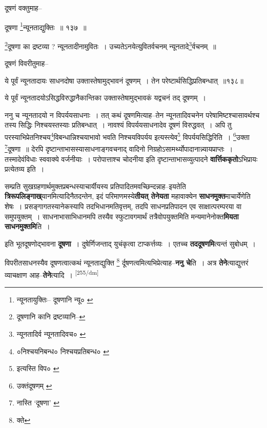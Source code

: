 \documentclass[article,12pt,a4paper]{memoir}
\begin{document}
	दूषणं वक्तुमाह-- 
	  
	दूषणा \footnote{न्यूनतायुक्तिः--\cite{dp-msB} \cite{dp-edP} \cite{dp-edH} दूषणानि न्यू० \cite{dp-edE}}न्यूनताद्युक्तिः ॥ १३७ ॥ 
	  
	\footnote{दूषणानि कानि द्रष्टव्यानि--\cite{dp-edE}}दूषणा का द्रष्टव्या ? न्यूनतादीनामुवितः । उच्यतेऽनयेत्युवितर्वचनम् न्यूनतादे\footnote{न्यूनतादिर्व \cite{dp-msA} \cite{dp-msB} \cite{dp-edP} \cite{dp-edH} न्यूनतादिवच० \cite{dp-edE} \cite{dp-edN}}र्वचनम् ॥ 
	  
	दूषणं विवरीतुमाह-- 
	  
	ये पूर्वं न्यूनतादायः साधनदोषा उक्तास्तेषामुद्भावनं दूषणम् । तेन परेष्टार्थसिद्धिप्रतिबन्धात् ॥१३८॥ 
	  
	ये पूर्वं न्यूनतादयोऽसिद्धविरुद्धानैकान्तिका उक्तास्तेषामुद्भावकं यद्वचनं तद् दूषणम् । 
	  
	ननु च न्यूनतादयो न विपर्ययसाधनाः । तत् कथं दूषणमित्याह--तेन न्यूनतादिवचनेन परेषामिष्टश्चासावर्थश्च तस्य सिद्धिः निश्चयस्तस्याः प्रतिबन्धात् । नावश्यं विपर्ययसाधनादेव दूषणं विरुद्धवत् । अपि तु परस्याभिप्रेतनिश्चय\footnote{०निश्चयनिबन्ध० \cite{dp-msA} \cite{dp-msB} \cite{dp-msC} \cite{dp-msD} \cite{dp-edP} \cite{dp-edH} \cite{dp-edN} निश्चयप्रतिबन्ध० \cite{dp-edE}}विबन्धान्निश्चयाभावो भवति निश्चयविपर्यय इत्यस्त्येव\footnote{इत्यस्ति विप० \cite{dp-msA} \cite{dp-edP} \cite{dp-edH} \cite{dp-edE}} विपर्ययसिद्धिरिति । \footnote{उक्तंदूषणम् \cite{dp-edE}}उक्ता \footnote{नास्ति ‘दूषणा’ \cite{dp-msA} \cite{dp-msB} \cite{dp-edP} \cite{dp-edH}}दूषणा ॥ देरपि दृष्टान्ताभासस्यासाधनाङ्गवचनाद् वादिनो निग्रहोऽसामर्थ्योपादानान्न्यायप्राप्तः । तस्मादेवंविधाः स्ववाक्ये वर्जनीयाः । परोपात्ताश्च चोदनीया इति दृष्टान्ताभासव्युत्पादने \textbf{वार्त्तिककृतो}ऽभिप्रायः प्रत्येतव्य इति ।
	\pend
      

	  \pstart सम्प्रति सुखग्रहणार्थमुक्तप्रबन्धस्याचार्यीयस्य प्रतिपादितमवच्छिन्दन्नाह--इयतेति \textbf{त्रिरूपलिङ्गाख्}यानमित्यादिनैतदन्तेन, इदं परिमाणमस्ये\textbf{तीयत् तेनेयता} महावाक्येन \textbf{साधनमुक्त}माचार्येणेति शेषः । प्रसङ्गागतस्यानेकस्यापि तदभिधानमतिवृत्तम्, तदपि साधनप्रतिपादन एव साक्षात्परम्परया वा समुपयुक्तम् । साधनाभासाभिधानमपि तस्यैव स्फुटावगमार्थं तत्रैवोपयुक्तमिति मन्यमानेनोक्त\textbf{मियता साधनमुक्तमि}ति ।
	\pend
      

	  \pstart इति भूतदूषणोद्भावना \textbf{दूषणा} । दुषेर्णिजन्ताद् युचंकृत्वा टाप्कर्त्तव्यः । एतच्च \textbf{तददूषणमि}त्यन्तं सुबोधम् ।
	\pend
      

	  \pstart विपरीतसाधनस्यैव दूषणत्वात्कथं न्यूनताद्युक्ति \footnote{क्ते} र्दूषणत्वमित्यभिप्रेत्याह--\textbf{ननु चे}ति । अत्र \textbf{तेने}त्याद्युत्तरं व्याचक्षाण आह--\textbf{तेने}त्यादि ।
	\pend
      \leavevmode\textsuperscript{\rmlatinfont\tiny [255/dm]}
\end{document}
